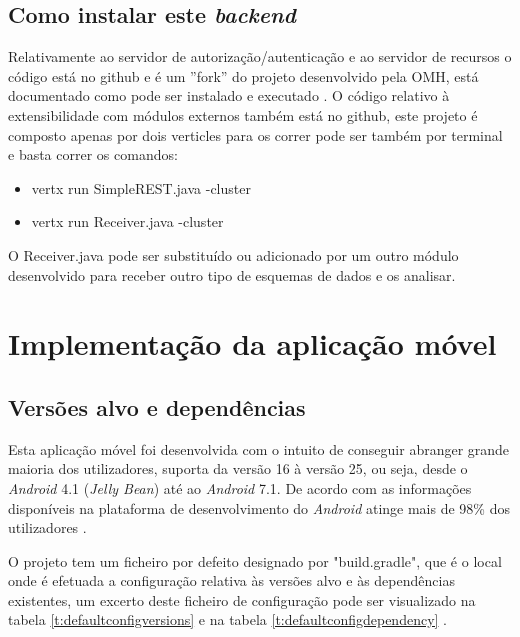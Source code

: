 \subsection{Como instalar este \textit{backend}}
Relativamente ao servidor de autorização/autenticação e ao servidor de recursos o código está no github \cite{omh-code} e é um ''fork'' do projeto desenvolvido pela \gls{OMH}, está documentado como pode ser instalado e executado \cite{omh-runnatively}.
O código relativo à extensibilidade com módulos externos também está no github\cite{restpubsub}, este projeto é composto apenas por dois verticles para os correr pode ser também por terminal e basta correr os comandos:
\begin{itemize}
    \item vertx run SimpleREST.java -cluster
    \item vertx run Receiver.java -cluster
\end{itemize}
O Receiver.java pode ser substituído ou adicionado por um outro módulo desenvolvido para receber outro tipo de esquemas de dados e os analisar.

\section{Implementação da aplicação móvel}
\subsection{Versões alvo e dependências}
Esta aplicação móvel foi desenvolvida com o intuito de conseguir abranger grande maioria dos utilizadores, suporta da versão 16 à versão 25, ou seja,  desde o \textit{Android} 4.1 (\textit{Jelly Bean}) até ao \textit{Android} 7.1. De acordo com as informações disponíveis na plataforma de desenvolvimento do \textit{Android} atinge mais de 98\% dos utilizadores \cite{android-versions}.

O projeto tem um ficheiro por defeito designado por "build.gradle", que é o local onde é efetuada a configuração relativa às versões alvo e às dependências existentes, um excerto deste ficheiro de configuração pode ser visualizado na tabela \ref{t:defaultconfigversions} e na tabela \ref{t:defaultconfigdependency} .


